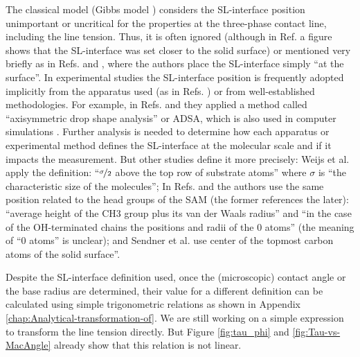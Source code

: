The classical model (Gibbs model \cite{gibbs:1873,gibbs:1948,gumma:2003,levitas:2014,rusanov:2004})
considers the SL-interface position unimportant or uncritical for
the properties at the three-phase contact line, including the line
tension. Thus, it is often ignored \cite{wang:2001,pompe:2002,giovambattista:2007,ruijter:1999}
(although in Ref. \cite{ruijter:1999} a figure shows that the SL-interface
was set closer to the solid surface) or mentioned very briefly as
in Refs. \cite{werder:2003} and \cite{sedlmeier:2008}, where the
authors place the SL-interface simply ``at the surface''. In experimental
studies the SL-interface position is frequently adopted implicitly
from the apparatus used (as in Refs. \cite{lee:2003,extrand:2003})
or from well-established methodologies. For example, in Refs. \cite{amirfazli:2003}
and \cite{gietzelt:2001} they applied a method called ``axisymmetric
drop shape analysis'' or ADSA, which is also used in computer simulations
\cite{ro:1997}. Further analysis is needed to determine how each
apparatus or experimental method defines the SL-interface at the molecular
scale and if it impacts the measurement. But other studies define
it more precisely: Weijs et al. \cite{weijs:2011} apply the definition:
\textquotedblleft$\nicefrac{\sigma}{2}$ above the top row of substrate
atoms\textquotedblright{} where $\sigma$ is ``the characteristic
size of the molecules''; In Refs. \cite{srivastava:2005} and \cite{hautman:1991}
the authors use the same position related to the head groups of the
SAM (the former references the later): ``average height of the CH3
group plus its van der Waals radius'' and ``in the case of the OH-terminated
chains the positions and radii of the 0 atoms'' (the meaning of ``0
atoms'' is unclear); and Sendner et al. \cite{sendner:2009} use
\textquotedblleftthe center of the topmost carbon atoms of the solid
surface''.

Despite the SL-interface definition used, once the (microscopic) contact
angle or the base radius are determined, their value for a different
definition can be calculated using simple trigonometric relations
as shown in Appendix \ref{chap:Analytical-transformation-of}. We
are still working on a simple expression to transform the line tension
directly. But Figure \ref{fig:tau_phi} and \ref{fig:Tau-vs-MacAngle}
already show that this relation is not linear.

